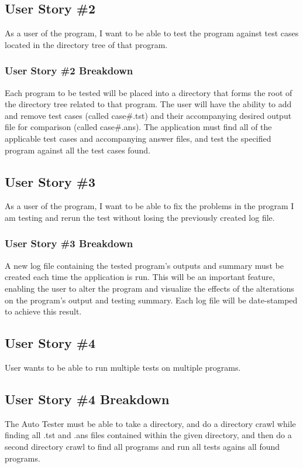 \subsection{User Story \#2} 

As a user of the program, I want to be able to test the program against test cases located in the directory tree of that program. 


\subsubsection{User Story \#2 Breakdown}
Each program to be tested will be placed into a directory that forms the root of the directory tree related to that program.
The user will have the ability to add and remove test cases  (called case\#.tst) and their accompanying desired output file
for comparison (called case\#.ans).  The application must find all of the applicable test cases and accompanying answer 
files, and test the specified program against all the test cases found.

\subsection{User Story \#3} 
As a user of the program, I want to be able to fix the problems in the program I am testing and rerun the test without losing
the previously created log file.

\subsubsection{User Story \#3 Breakdown}
A new log file containing the tested program's outputs and summary must be created each time the application is run.
This will be an important feature, enabling the user to alter the program and visualize the effects of the alterations on
the program's output and testing summary.  Each log file will be date-stamped to achieve this result.

\subsection{User Story \#4}
User wants to be able to run multiple tests on multiple programs.

\subsection{User Story \#4 Breakdown}
The Auto Tester must be able to take a directory, and do a directory crawl while finding all .tst and .ans files contained 
within the given directory, and then do a second directory crawl to find all programs and run all tests agains all found 
programs. 

